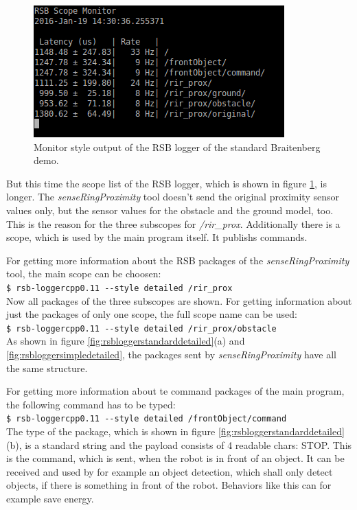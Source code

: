 \begin{figure}[htb]
\begin{center}
\includegraphics[scale=0.6]{Bilder/rsbloggerpics/rsb_br_standard_monitor.png}
\caption{Monitor style output of the RSB logger of the standard Braitenberg demo.}
\label{fig:rsbloggerstandardmonitor}
\end{center}
\end{figure}

But this time the scope list of the RSB logger, which is shown in figure \ref{fig:rsbloggerstandardmonitor}, is longer. The {\it senseRingProximity} tool doesn't send the original proximity sensor values only, but the sensor values for the obstacle and the ground model, too. This is the reason for the three subscopes for {\it /rir\_prox}. Additionally there is a scope, which is used by the main program itself. It publishs commands.

For getting more information about the RSB packages of the {\it senseRingProximity} tool, the main scope can be choosen: \\
{\tt\$ rsb-loggercpp0.11 -{}-style detailed /rir\_prox} \\
Now all packages of the three subscopes are shown. For getting information about just the packages of only one scope, the full scope name can be used: \\
{\tt\$ rsb-loggercpp0.11 -{}-style detailed /rir\_prox/obstacle} \\
As shown in figure \ref{fig:rsbloggerstandarddetailed}(a) and \ref{fig:rsbloggersimpledetailed}, the packages sent by {\it senseRingProximity} have all the same structure.

For getting more information about te command packages of the main program, the following command has to be typed: \\
{\tt\$ rsb-loggercpp0.11 -{}-style detailed /frontObject/command} \\
The type of the package, which is shown in figure \ref{fig:rsbloggerstandarddetailed}(b), is a standard string and the payload consists of 4 readable chars: STOP. This is the command, which is sent, when the robot is in front of an object. It can be received and used by for example an object detection, which shall only detect objects, if there is something in front of the robot. Behaviors like this can for example save energy.


